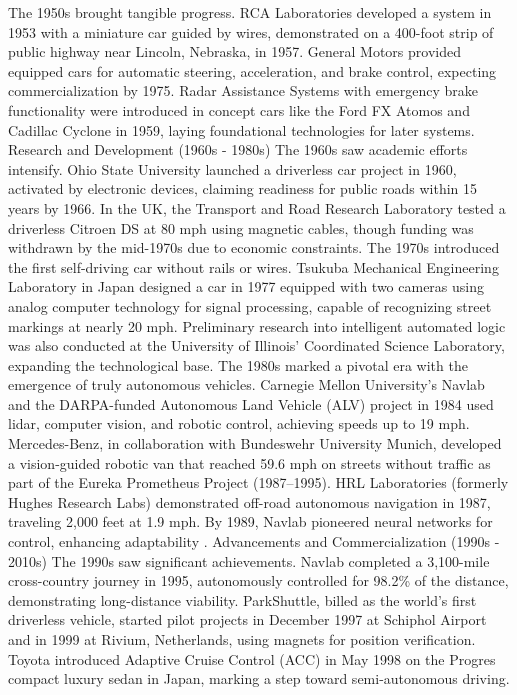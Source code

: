 The 1950s brought tangible progress. RCA Laboratories developed a system in 1953 with a miniature car guided by wires, demonstrated on a 400-foot strip of public highway near Lincoln, Nebraska, in 1957. General Motors provided equipped cars for automatic steering, acceleration, and brake control, expecting commercialization by 1975. Radar Assistance Systems with emergency brake functionality were introduced in concept cars like the Ford FX Atomos and Cadillac Cyclone in 1959, laying foundational technologies for later systems.
Research and Development (1960s - 1980s)
The 1960s saw academic efforts intensify. Ohio State University launched a driverless car project in 1960, activated by electronic devices, claiming readiness for public roads within 15 years by 1966. In the UK, the Transport and Road Research Laboratory tested a driverless Citroen DS at 80 mph using magnetic cables, though funding was withdrawn by the mid-1970s due to economic constraints.
The 1970s introduced the first self-driving car without rails or wires. Tsukuba Mechanical Engineering Laboratory in Japan designed a car in 1977 equipped with two cameras using analog computer technology for signal processing, capable of recognizing street markings at nearly 20 mph. Preliminary research into intelligent automated logic was also conducted at the University of Illinois' Coordinated Science Laboratory, expanding the technological base.
The 1980s marked a pivotal era with the emergence of truly autonomous vehicles. Carnegie Mellon University’s Navlab and the DARPA-funded Autonomous Land Vehicle (ALV) project in 1984 used lidar, computer vision, and robotic control, achieving speeds up to 19 mph. Mercedes-Benz, in collaboration with Bundeswehr University Munich, developed a vision-guided robotic van that reached 59.6 mph on streets without traffic as part of the Eureka Prometheus Project (1987–1995). HRL Laboratories (formerly Hughes Research Labs) demonstrated off-road autonomous navigation in 1987, traveling 2,000 feet at 1.9 mph. By 1989, Navlab pioneered neural networks for control, enhancing adaptability .
Advancements and Commercialization (1990s - 2010s)
The 1990s saw significant achievements. Navlab completed a 3,100-mile cross-country journey in 1995, autonomously controlled for 98.2\% of the distance, demonstrating long-distance viability. ParkShuttle, billed as the world’s first driverless vehicle, started pilot projects in December 1997 at Schiphol Airport and in 1999 at Rivium, Netherlands, using magnets for position verification. Toyota introduced Adaptive Cruise Control (ACC) in May 1998 on the Progres compact luxury sedan in Japan, marking a step toward semi-autonomous driving.
